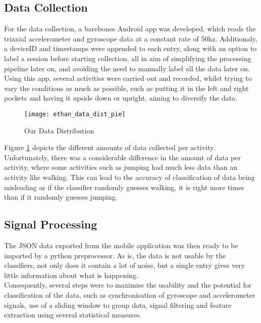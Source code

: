 \subsection{Data Collection}
For the data collection, a barebones Android app was developed, which reads the triaxial accelerometer and gyroscope data at a constant rate of 50hz.
Additionaly, a deviceID and timestamps were appended to each entry, along with an option to label a session before starting collection, all in aim of simplifying the processing pipeline later on,
and avoiding the need to manually label all the data later on.\\
Using this app, several activities were carried out and recorded, whilst trying to vary the conditions as much as possible, such as putting it in the left and right pockets and having it upside down or upright, aiming to diversify the data.  

\begin{figure}[htp]
    \centering
    \texttt{[image: ethan\_data\_dist\_pie]}
    \caption{Our Data Distribution}
    \label{our_data_count_dist}
    \end{figure}

Figure \ref{our_data_count_dist} depicts the different amounts of data collected per activity. Unfortunately, there was a considerable difference in the amount of data per activity, where some activities such as jumping had much less data than an activity like walking. This can lead to the accuracy of classification of data being misleading as if the classifier randomly guesses walking, it is right more times than if it randomly guesses jumping. 

\subsection{Signal Processing}
The JSON data exported from the mobile application was then ready to be imported by a python preprocessor. As is, the data is not usable by the classifiers, not only does it contain a lot of noise, but a single entry gives very little information about what is happening.\\
Consequently, several steps were to maximise the usability and the potential for classification of the data, such as synchronisation of gyroscope and accelerometer signals, use of a sliding window to group data, signal filtering and feature extraction using several statistical measures.   

